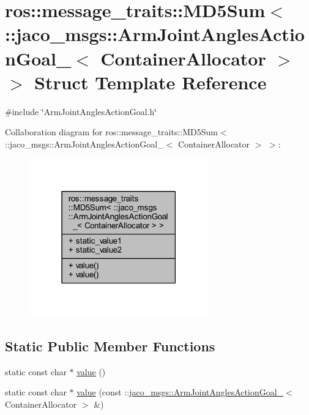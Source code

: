 \hypertarget{structros_1_1message__traits_1_1MD5Sum_3_01_1_1jaco__msgs_1_1ArmJointAnglesActionGoal___3_01ContainerAllocator_01_4_01_4}{}\section{ros\+:\+:message\+\_\+traits\+:\+:M\+D5\+Sum$<$ \+:\+:jaco\+\_\+msgs\+:\+:Arm\+Joint\+Angles\+Action\+Goal\+\_\+$<$ Container\+Allocator $>$ $>$ Struct Template Reference}
\label{structros_1_1message__traits_1_1MD5Sum_3_01_1_1jaco__msgs_1_1ArmJointAnglesActionGoal___3_01ContainerAllocator_01_4_01_4}


{\ttfamily \#include \char`\"{}Arm\+Joint\+Angles\+Action\+Goal.\+h\char`\"{}}



Collaboration diagram for ros\+:\+:message\+\_\+traits\+:\+:M\+D5\+Sum$<$ \+:\+:jaco\+\_\+msgs\+:\+:Arm\+Joint\+Angles\+Action\+Goal\+\_\+$<$ Container\+Allocator $>$ $>$\+:
\nopagebreak
\begin{figure}[H]
\begin{center}
\leavevmode
\includegraphics[width=219pt]{d6/daf/structros_1_1message__traits_1_1MD5Sum_3_01_1_1jaco__msgs_1_1ArmJointAnglesActionGoal___3_01Contdb48cc838ea133b2d65cea8722d2f3f9}
\end{center}
\end{figure}
\subsection*{Static Public Member Functions}
\begin{DoxyCompactItemize}
\item 
static const char $\ast$ \hyperlink{structros_1_1message__traits_1_1MD5Sum_3_01_1_1jaco__msgs_1_1ArmJointAnglesActionGoal___3_01ContainerAllocator_01_4_01_4_a173fe4a8ebc2f90fe4ec30183343c76e}{value} ()
\item 
static const char $\ast$ \hyperlink{structros_1_1message__traits_1_1MD5Sum_3_01_1_1jaco__msgs_1_1ArmJointAnglesActionGoal___3_01ContainerAllocator_01_4_01_4_a2a555a9c50a501037cf2c1ccaea96176}{value} (const \+::\hyperlink{structjaco__msgs_1_1ArmJointAnglesActionGoal__}{jaco\+\_\+msgs\+::\+Arm\+Joint\+Angles\+Action\+Goal\+\_\+}$<$ Container\+Allocator $>$ \&)
\end{DoxyCompactItemize}
